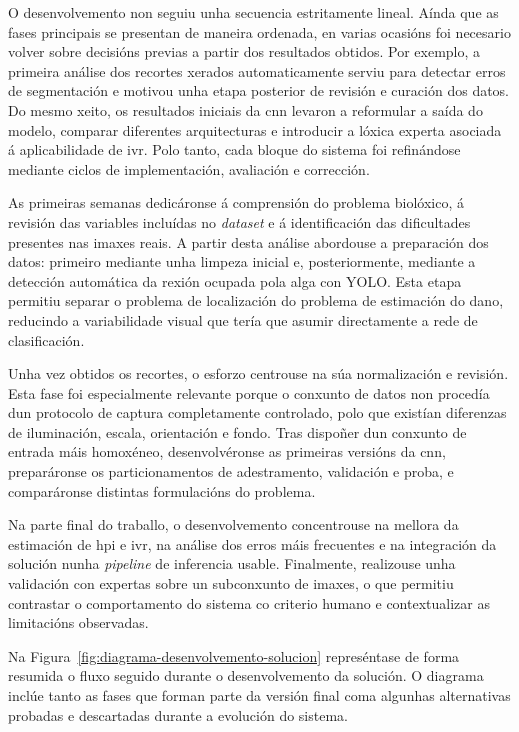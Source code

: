 O desenvolvemento non seguiu unha secuencia estritamente lineal. Aínda que as fases principais se
presentan de maneira ordenada, en varias ocasións foi necesario volver sobre decisións previas a
partir dos resultados obtidos. Por exemplo, a primeira análise dos recortes xerados automaticamente
serviu para detectar erros de segmentación e motivou unha etapa posterior de revisión e curación dos
datos. Do mesmo xeito, os resultados iniciais da \gls{cnn} levaron a reformular a saída do modelo,
comparar diferentes arquitecturas e introducir a lóxica experta asociada á aplicabilidade de
\gls{ivr}. Polo tanto, cada bloque do sistema foi refinándose mediante ciclos de implementación,
avaliación e corrección.

As primeiras semanas dedicáronse á comprensión do problema biolóxico, á revisión das variables
incluídas no \textit{dataset} e á identificación das dificultades presentes nas imaxes reais. A
partir desta análise abordouse a preparación dos datos: primeiro mediante unha limpeza inicial e,
posteriormente, mediante a detección automática da rexión ocupada pola alga con YOLO. Esta etapa
permitiu separar o problema de localización do problema de estimación do dano, reducindo a
variabilidade visual que tería que asumir directamente a rede de clasificación.

Unha vez obtidos os recortes, o esforzo centrouse na súa normalización e revisión. Esta fase foi
especialmente relevante porque o conxunto de datos non procedía dun protocolo de captura
completamente controlado, polo que existían diferenzas de iluminación, escala, orientación e fondo.
Tras dispoñer dun conxunto de entrada máis homoxéneo, desenvolvéronse as primeiras versións da
\gls{cnn}, preparáronse os particionamentos de adestramento, validación e proba, e comparáronse
distintas formulacións do problema.

Na parte final do traballo, o desenvolvemento concentrouse na mellora da estimación de \gls{hpi} e
\gls{ivr}, na análise dos erros máis frecuentes e na integración da solución nunha \textit{pipeline}
de inferencia usable. Finalmente, realizouse unha validación con expertas sobre un subconxunto de
imaxes, o que permitiu contrastar o comportamento do sistema co criterio humano e contextualizar as
limitacións observadas.

Na Figura~\ref{fig:diagrama-desenvolvemento-solucion} represéntase de forma resumida o fluxo seguido
durante o desenvolvemento da solución. O diagrama inclúe tanto as fases que forman parte da versión
final coma algunhas alternativas probadas e descartadas durante a evolución do sistema.

